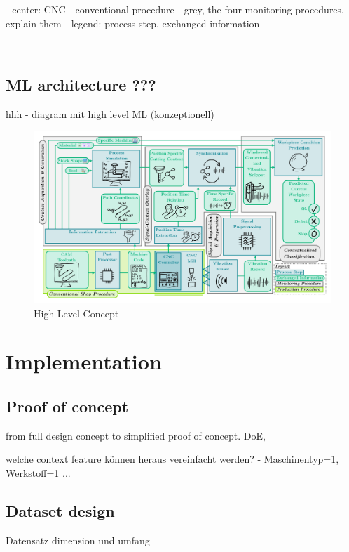 \documentclass[5p,times,procedia]{elsarticle}
\begin{document}
- center: CNC
- conventional procedure
- grey, the four monitoring procedures, explain them
- legend: process step, exchanged information


---




\subsection{ML architecture ???}
\vspace*{-\baselineskip}
hhh
- diagram mit high level ML (konzeptionell)



\begin{figure}[t]
    \centering
    \includegraphics[width=0.99\linewidth]{ConceptDiagram.pdf}
    \caption{High-Level Concept}
    \label{Fig_ConceptDiagram}
\end{figure}
 
\section{Implementation}
\subsection{Proof of concept}
\vspace*{-\baselineskip}
from full design concept to simplified proof of concept.
DoE,  

welche context feature können heraus vereinfacht werden? - Maschinentyp=1, Werkstoff=1 ...



\subsection{Dataset design}
\vspace*{-\baselineskip}
Datensatz dimension und umfang
\end{document}
